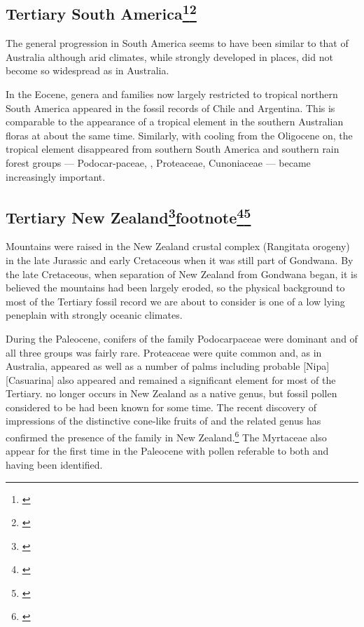 \subsection[Tertiary South America]{Tertiary South America\footnote{\cite{wace1965vascular}}\footnote{\cite{kemp1978tertiary}}}

The general progression in South America seems to have been similar to that of Australia although arid climates, while strongly developed in places, did not become so widespread as in Australia.

In the Eocene, genera and families now largely restricted to tropical northern South America appeared in the fossil records of Chile and Argentina.
This is comparable to the appearance of a tropical element in the southern Australian floras at about the same time.
Similarly, with cooling from the Oligocene on, the tropical element disappeared from southern South America and southern rain forest groups --- Podocar-paceae, , Proteaceae, Cunoniaceae --- became increasingly important.

\subsection[Tertiary New Zealand]{Tertiary New Zealand\footnote{\cite{mildenhall1980new}}footnote{\cite{fleming1979geological}}\footnote{\cite{mildenhall1984palaeobotanical}}\footnote{\cite{pocknall1984late}}}

Mountains were raised in the New Zealand crustal complex (Rangitata orogeny) in the late Jurassic and early Cretaceous when it was still part of Gondwana.
By the late Cretaceous, when separation of New Zealand from Gondwana began, it is believed the mountains had been largely eroded, so the physical background to most of the Tertiary fossil record we are about to consider is one of a low lying peneplain with strongly oceanic climates.

During the Paleocene, conifers of the family Podocarpaceae were dominant and  of all three groups was fairly rare.
Proteaceae were quite common and, as in Australia,  appeared as well as a number of palms including probable [Nipa][Casuarina] also appeared and remained a significant element for most of the Tertiary.
 no longer occurs in New Zealand as a native genus, but fossil pollen considered to be  had been known for some time.
The recent discovery of impressions of the distinctive cone-like fruits of  and the related genus  has confirmed the presence of the family in New Zealand.\footnote{\cite{campbell1985megafossils}}
The Myrtaceae also appear for the first time in the Paleocene with pollen referable to both  and  having been identified.

